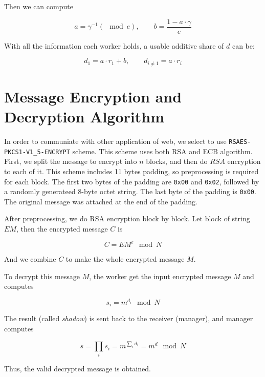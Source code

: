 Then we can compute

\begin{equation}
  a = \gamma^{-1} (\mod e), \qquad b = \frac{1-a \cdot \gamma}{e}
\end{equation}

With all the information each worker holds, a usable additive share of $d$ can be:

\begin{equation}
  d_1 = a\cdot r_1 + b, \qquad d_{i \neq 1} = a \cdot r_i
\end{equation}

\section{Message Encryption and Decryption Algorithm}

In order to communiate with other application of web, we select to use \texttt{RSAES-PKCS1-V1\_5-ENCRYPT} scheme. This scheme uses both RSA and ECB algorithm. First, we split the message to encrypt into $n$ blocks, and then do $RSA$ encryption to each of it. This scheme includes 11 bytes padding, so preprocessing is required for each block. The first two bytes of the padding are \texttt{0x00} and \texttt{0x02}, followed by a randomly generateed 8-byte octet string. The last byte of the padding is \texttt{0x00}. The original message was attached at the end of the padding.

After preprocessing, we do RSA encryption block by block. Let block of string $EM$, then the encrypted message $C$ is

\begin{equation}
  C = EM^e \mod N
\end{equation}

And we combine $C$ to make the whole encrypted message $M$.

To decrypt this message $M$, the worker get the input encrypted message $M$ and computes

\begin{equation}
  s_i = m^{d_i} \mod N
\end{equation}

The result (called \textit{shadow}) is sent back to the receiver (manager), and manager computes

\begin{equation}
  s = \prod_i s_i = m^{\sum_i d_i} = m^d \mod N
\end{equation}

Thus, the valid decrypted message is obtained.

